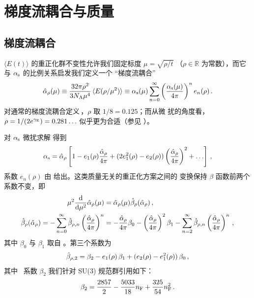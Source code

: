 \section{梯度流耦合与质量}\label{sec:couplingandmass}

\subsection{梯度流耦合}

$\langle E(t)\rangle$ 的重正化群不变性允许我们固定标度 $\mu=\sqrt{\rho/t}$
（$\rho\in\mathbb{R}$ 为常数），而它与 $\alpha_\mathrm{s}$ 的比例关系启发我们定义一个
``梯度流耦合''
\begin{equation}
  \begin{split}
    \hat\alpha_\rho(\mu) \equiv \frac{32\pi\rho^2}{3N_\mathrm{A}\mu^4}\,\langle
    E(\rho/\mu^2)\rangle \equiv
    \alpha_\mathrm{s}(\mu)\sum_{n=0}^\infty\left(\frac{\alpha_\mathrm{s}(\mu)}{4\pi}\right)^n
    e_{n}(\rho)\,.
  \end{split}
\end{equation}
对通常的梯度流耦合定义\,\cite{Luscher:2010iy}，$\rho$ 取 $1/8=0.125$；而从微
扰的角度看，$\rho=1/(2e^{\gamma_\mathrm{E}})=0.281\ldots$
似乎更为合适（参见 ）。

对 $\alpha_\mathrm{s}$ 微扰求解  得到
\begin{equation}
  \begin{split}
    \alpha_\mathrm{s} = \hat\alpha_\rho\left[ 1 - e_{1}(\rho)\frac{\hat\alpha_\rho}{4\pi} +
      (2e_{1}^2(\rho)-e_{2}(\rho))\left(\frac{\hat\alpha_\rho}{4\pi}\right)^2 +
      \ldots\right]\,,
  \end{split}
\end{equation}
系数 $e_{n}(\rho)$ 由  给出。这类质量无关的重正化方案之间的
变换保持 $\beta$ 函数前两个系数不变，即
\begin{equation}
  \begin{split}
    \mu^2\dderiv{}{\mu^2}\alphagf(\mu) &= \alphagf(\mu)\betagf{}(\alphagf)\,,\\
    \betagf{}(\alphagf) = -\sum_{n=0}^\infty\betagf{n}
    \left(\frac{\alphagf}{4\pi}\right)^n
    &= - \frac{\alphagf}{4\pi}\beta_0
     - \left(\frac{\alphagf}{4\pi}\right)^2\beta_1
     -\sum_{n=2}^\infty\betagf{n}
     \left(\frac{\alphagf}{4\pi}\right)^n\,,
  \end{split}
\end{equation}
其中 $\beta_0$ 与 $\beta_1$ 取自 。第三个系数为
\begin{equation}
  \begin{split}
    \betagf{2} = \beta_2 - e_{1}(\rho)\,\beta_1 + (e_{2}(\rho)
    - e_{1}^2(\rho))\,\beta_0\,,
  \end{split}
\end{equation}
其中 \msbar\ 系数 $\beta_2$ 我们针对 SU(3) 规范群引用如下：
\begin{equation}
  \begin{split}
    \beta_2 = \frac{2857}{2} - \frac{5033}{18}n_\mathrm{F} + \frac{325}{54}n_\mathrm{F}^2\,.
  \end{split}
\end{equation}

